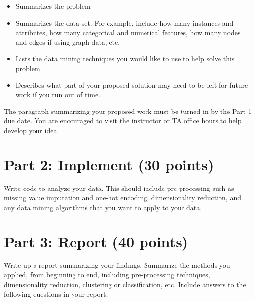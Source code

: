 \documentclass[11pt]{article}
\begin{document}
\begin{itemize}

    \item Summarizes the problem

    \item Summarizes the data set.  For example, include how many instances and
    attributes, how many categorical and numerical features, how many nodes and
    edges if using graph data, etc.

    \item Lists the data mining techniques you would like to use to help solve
    this problem.

    \item Describes what part of your proposed solution may need to be left for
    future work if you run out of time.

\end{itemize}

The paragraph summarizing your proposed work must be turned in by the Part 1 due
date. You are encouraged to visit the instructor or TA office hours to help
develop your idea.


\section*{Part 2: Implement (30 points)}

Write code to analyze your data. This should include pre-processing such as
missing value imputation and one-hot encoding, dimensionality reduction, and any
data mining algorithms that you want to apply to your data.

\section*{Part 3: Report (40 points)}

Write up a report summarizing your findings. Summarize the methods you applied,
from beginning to end, including pre-processing techniques, dimensionality
reduction, clustering or classification, etc. Include answers to the following
questions in your report:
\end{document}
